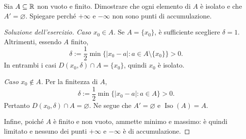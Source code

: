 \begin{exercise}
\label{ex:fondamenti-insieme-finito-isolati}
Sia $A\subseteq\mathbb{R}$ non vuoto e finito. Dimostrare che ogni
elemento di $A$ è isolato e che $A'=\varnothing$.
Spiegare perché $+\infty$ e $-\infty$ non sono punti
di accumulazione.
\end{exercise}
\begin{proof}[Soluzione dell'esercizio]
\emph{Caso $x_0\in A$.} Se $A=\{x_0\}$, è sufficiente
scegliere $\delta=1$. Altrimenti, essendo $A$ finito,
\[
  \delta:=\frac12\min\{|x_0-a|:a\in A\setminus\{x_0\}\}>0.
\]
In entrambi i casi $D(x_0,\delta)\cap A=\{x_0\}$,
quindi $x_0$ è isolato.

\emph{Caso $x_0\notin A$.} Per la finitezza di $A$,
\[
  \delta:=\frac12\min\{|x_0-a|:a\in A\}>0.
\]
Pertanto $D(x_0,\delta)\cap A=\varnothing$.
Ne segue che $A'=\varnothing$ e
$\operatorname{Iso}(A)=A$.

Infine, poiché $A$ è finito e non vuoto, ammette
minimo e massimo: è quindi limitato e nessuno dei
punti $+\infty$ e $-\infty$ è di accumulazione.
\end{proof}
